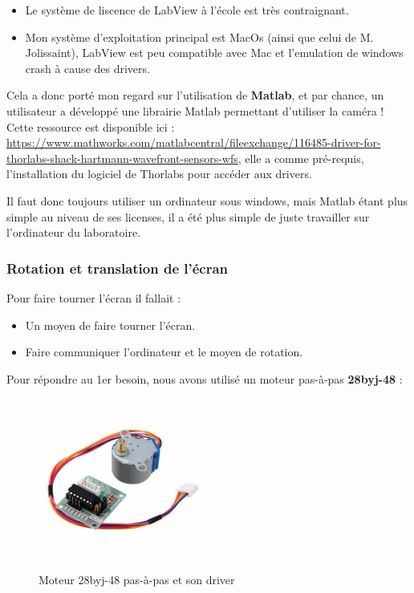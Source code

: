 \begin{itemize}
    \item Le système de liscence de LabView à l'école est très contraignant.
    \item Mon système d'exploitation principal est MacOs (ainsi que celui de M. Jolissaint), LabView est peu compatible avec Mac et l'emulation de windows crash à cause des drivers.
\end{itemize}

Cela a donc porté mon regard sur l'utilisation de \textbf{Matlab}, et par chance, un utilisateur a développé une librairie Matlab permettant d'utiliser la caméra ! Cette ressource est disponible ici :
\url{https://www.mathworks.com/matlabcentral/fileexchange/116485-driver-for-thorlabs-shack-hartmann-wavefront-sensors-wfs}, elle a comme pré-requis, l'installation du logiciel de Thorlabs pour accéder aux drivers.

Il faut donc toujours utiliser un ordinateur sous windows, mais Matlab étant plus simple au niveau de ses licenses, il a été plus simple de juste travailler sur l'ordinateur du laboratoire.

\subsubsection{Rotation et translation de l'écran}
Pour faire tourner l'écran il fallait :
\begin{itemize}
    \item Un moyen de faire tourner l'écran.
    \item Faire communiquer l'ordinateur et le moyen de rotation.
\end{itemize}

Pour répondre au 1er besoin, nous avons utilisé un moteur pas-à-pas \textbf{28byj-48} :
\begin{figure}[H]
    \centering
    \includegraphics[width=0.5\textwidth]{assets/figures/ameliorations/stepper.jpeg}
    \caption[Moteur 28byj-48 pas-à-pas et son driver]{Moteur 28byj-48 pas-à-pas et son driver \autocite{photo_28byj-48}}
    \label{fig:Photo_moteur_28byj-48}
\end{figure}

